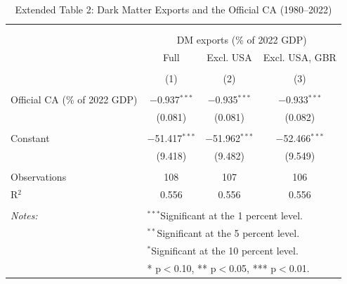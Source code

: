 \documentclass[11pt]{article}
\begin{document}
\small
\setcounter{table}{1}

\renewcommand{\thetable}{E2}
\begin{table}[!htbp] \centering 
  \caption{Extended Table 2: Dark Matter Exports and the Official CA (1980--2022)} 
  \label{tab:E2_extended} 
\begin{tabular}{@{\extracolsep{5pt}}lccc} 
\\[-1.8ex]\hline 
\hline \\[-1.8ex] 
\\[-1.8ex] & \multicolumn{3}{c}{DM exports (\% of 2022 GDP)} \\ 
 & Full & Excl. USA & Excl. USA, GBR \\ 
\\[-1.8ex] & (1) & (2) & (3)\\ 
\hline \\[-1.8ex] 
 Official CA (\% of 2022 GDP) & $-$0.937$^{***}$ & $-$0.935$^{***}$ & $-$0.933$^{***}$ \\ 
  & (0.081) & (0.081) & (0.082) \\ 
  & & & \\ 
 Constant & $-$51.417$^{***}$ & $-$51.962$^{***}$ & $-$52.466$^{***}$ \\ 
  & (9.418) & (9.482) & (9.549) \\ 
  & & & \\ 
Observations & 108 & 107 & 106 \\ 
R$^{2}$ & 0.556 & 0.556 & 0.556 \\ 
\hline \\[-1.8ex] 
\textit{Notes:} & \multicolumn{3}{l}{$^{***}$Significant at the 1 percent level.} \\ 
 & \multicolumn{3}{l}{$^{**}$Significant at the 5 percent level.} \\ 
 & \multicolumn{3}{l}{$^{*}$Significant at the 10 percent level.} \\ 
 & \multicolumn{3}{l}{* p$<$0.10, ** p$<$0.05, *** p$<$0.01.} \\ 
\end{tabular} 
\end{table} 
\end{document}
